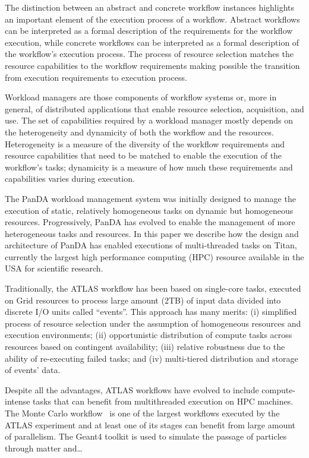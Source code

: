 The distinction between an abstract and concrete workflow instances highlights
an important element of the execution process of a workflow. Abstract workflows
can be interpreted as a formal description of the requirements for the workflow
execution, while concrete workflows can be interpreted as a formal description
of the workflow's execution process. The process of resource selection matches
the resource capabilities to the workflow requirements making possible the
transition from execution requirements to execution process.

Workload managers are those components of workflow systems or, more in general,
of distributed applications that enable resource selection, acquisition, and
use. The set of capabilities required by a workload manager mostly depends on
the heterogeneity and dynamicity of both the workflow and the resources.
Heterogeneity is a measure of the diversity of the workflow requirements and
resource capabilities that need to be matched to enable the execution of the
workflow's tasks; dynamicity is a measure of how much these requirements and
capabilities varies during execution.

The PanDA workload management system was initially designed to manage the
execution of static, relatively homogeneous tasks on dynamic but homogeneous
resources. Progressively, PanDA has evolved to enable the management of more
heterogeneous tasks and resources. In this paper we describe how the design and
architecture of PanDA has enabled executions of multi-threaded tasks on Titan,
currently the largest high performance computing (HPC) resource available in the
USA for scientific research.

Traditionally, the ATLAS workflow has been based on single-core tasks, executed
on Grid resources to process large amount (2TB) of input data divided into
discrete I/O units called ``events''. This approach has many merits: (i)
simplified process of resource selection under the assumption of homogeneous
resources and execution environments; (ii) opportunistic distribution of compute
tasks across resources based on contingent availability; (iii) relative
robustness due to the ability of re-executing failed tasks; and (iv)
multi-tiered distribution and storage of events' data.

Despite all the advantages, ATLAS workflows have evolved to include
compute-intense tasks that can benefit from multithreaded execution on HPC
machines. The Monte Carlo workflow~\cite{} is one of the largest workflows
executed by the ATLAS experiment and at least one of its stages can benefit from
large amount of parallelism. The Geant4 toolkit is used to simulate the passage
of particles through matter and\ldots

